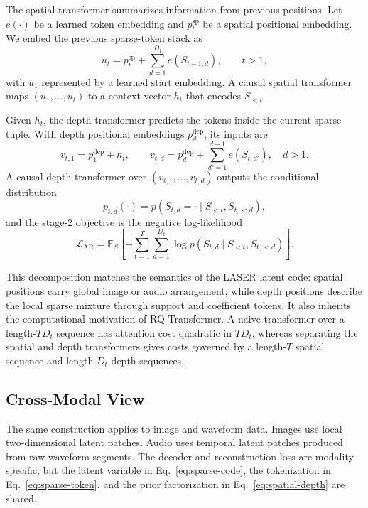 \documentclass[10pt]{article}
\begin{document}
The spatial transformer summarizes information from previous positions. Let $e(\cdot)$ be a learned token embedding and $p^{\mathrm{sp}}_t$ be a spatial positional embedding. We embed the previous sparse-token stack as
\begin{equation}
    u_t = p^{\mathrm{sp}}_t + \sum_{d=1}^{D_t} e(S_{t-1,d}), \qquad t>1,
\end{equation}
with $u_1$ represented by a learned start embedding. A causal spatial transformer maps $(u_1,\ldots,u_t)$ to a context vector $h_t$ that encodes $S_{<t}$.

Given $h_t$, the depth transformer predicts the tokens inside the current sparse tuple. With depth positional embeddings $p^{\mathrm{dep}}_d$, its inputs are
\begin{equation}
    v_{t,1}=p^{\mathrm{dep}}_1+h_t,\qquad
    v_{t,d}=p^{\mathrm{dep}}_d+\sum_{d'=1}^{d-1}e(S_{t,d'}),\quad d>1.
\end{equation}
A causal depth transformer over $(v_{t,1},\ldots,v_{t,d})$ outputs the conditional distribution
\begin{equation}
    p_{t,d}(\cdot)
    =
    p(S_{t,d}=\cdot \mid S_{<t},S_{t,<d}),
\end{equation}
and the stage-2 objective is the negative log-likelihood
\begin{equation}
    \mathcal{L}_{\mathrm{AR}}
    =
    \mathbb{E}_{S}\left[
    -\sum_{t=1}^{T}\sum_{d=1}^{D_t}
    \log p(S_{t,d}\mid S_{<t},S_{t,<d})
    \right].
\end{equation}

This decomposition matches the semantics of the LASER latent code: spatial positions carry global image or audio arrangement, while depth positions describe the local sparse mixture through support and coefficient tokens. It also inherits the computational motivation of RQ-Transformer. A naive transformer over a length-$TD_t$ sequence has attention cost quadratic in $TD_t$, whereas separating the spatial and depth transformers gives costs governed by a length-$T$ spatial sequence and length-$D_t$ depth sequences.

\subsection{Cross-Modal View}

The same construction applies to image and waveform data. Images use local two-dimensional latent patches. Audio uses temporal latent patches produced from raw waveform segments. The decoder and reconstruction loss are modality-specific, but the latent variable in Eq.~\ref{eq:sparse-code}, the tokenization in Eq.~\ref{eq:sparse-token}, and the prior factorization in Eq.~\ref{eq:spatial-depth} are shared.
\end{document}
